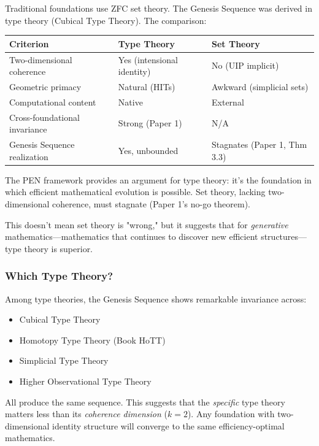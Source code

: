 \documentclass[11pt]{article}
\theoremstyle{definition}
\begin{document}
Traditional foundations use ZFC set theory. The Genesis Sequence was derived in type theory (Cubical Type Theory). The comparison:

\begin{center}
\begin{tabular}{lll}
\toprule
\textbf{Criterion} & \textbf{Type Theory} & \textbf{Set Theory} \\
\midrule
Two-dimensional coherence & Yes (intensional identity) & No (UIP implicit) \\
Geometric primacy & Natural (HITs) & Awkward (simplicial sets) \\
Computational content & Native & External \\
Cross-foundational invariance & Strong (Paper 1) & N/A \\
Genesis Sequence realization & Yes, unbounded & Stagnates (Paper 1, Thm 3.3) \\
\bottomrule
\end{tabular}
\end{center}

The PEN framework provides an argument for type theory: it's the foundation in which efficient mathematical evolution is possible. Set theory, lacking two-dimensional coherence, must stagnate (Paper 1's no-go theorem).

This doesn't mean set theory is "wrong," but it suggests that for \emph{generative} mathematics—mathematics that continues to discover new efficient structures—type theory is superior.

\subsubsection{Which Type Theory?}

Among type theories, the Genesis Sequence shows remarkable invariance across:
\begin{itemize}
\item Cubical Type Theory
\item Homotopy Type Theory (Book HoTT)
\item Simplicial Type Theory
\item Higher Observational Type Theory
\end{itemize}

All produce the same sequence. This suggests that the \emph{specific} type theory matters less than its \emph{coherence dimension} ($k=2$). Any foundation with two-dimensional identity structure will converge to the same efficiency-optimal mathematics.
\end{document}
